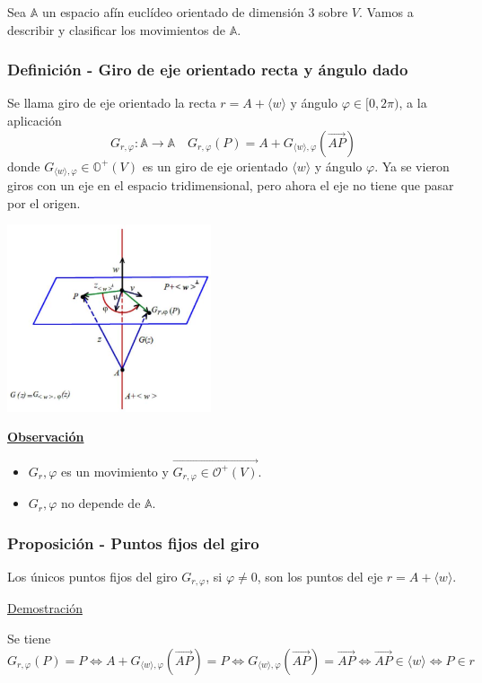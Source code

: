 \documentclass[12pt, a4paper, ones, notitlepage, openany,titlepage]{article}
\newcommand{\demostracion}{\noindent\underline{Demostración}}
\newcommand{\observacion}{\noindent\underline{\textbf{Observación}}}
\begin{document}
Sea $\mathbb{A}$ un espacio afín euclídeo orientado de dimensión 3 sobre $V$. Vamos a describir y clasificar los movimientos de $\mathbb{A}$.

\subsubsection{Definición - Giro de eje orientado recta y ángulo dado}
\noindent Se llama giro de eje orientado la recta $r=A+\langle w\rangle$ y ángulo $\varphi \in[0,2 \pi)$, a la aplicación
$$
G_{r, \varphi}: \mathbb{A} \rightarrow \mathbb{A} \quad G_{r, \varphi}(P)=A+G_{\langle w\rangle, \varphi}(\overrightarrow{A P})
$$
donde $G_{\langle w\rangle, \varphi} \in \mathbb{O}^{+}(V)$ es un giro de eje orientado $\langle w\rangle$ y ángulo $\varphi$. Ya se vieron giros con un eje en el espacio tridimensional, pero ahora el eje no tiene que pasar por el origen.

\begin{center}
	\includegraphics[max width=6cm]{2023_05_02_d6703e6c81ebe4fb6eaag-083}
\end{center}

\observacion
\begin{itemize}
	\item $G_r,\varphi$ es un movimiento y $\overrightarrow{G_{r,\varphi} \in \mathcal{O}^+(V)}$.
	\item $G_r,\varphi$ no depende de $\mathbb{A}$.
\end{itemize}

\subsubsection{Proposición - Puntos fijos del giro}
Los únicos puntos fijos del giro $G_{r, \varphi}$, si $\varphi \neq 0$, son los puntos del eje $r=A+\langle w\rangle$.

\demostracion

\noindent Se tiene
$$
G_{r, \varphi}(P)=P \Longleftrightarrow A+G_{\langle w\rangle, \varphi}(\overrightarrow{A P})=P \Longleftrightarrow G_{\langle w\rangle, \varphi}(\overrightarrow{A P})=\overrightarrow{A P} \Longleftrightarrow \overrightarrow{A P} \in\langle w\rangle \Longleftrightarrow P \in r
$$
\end{document}

